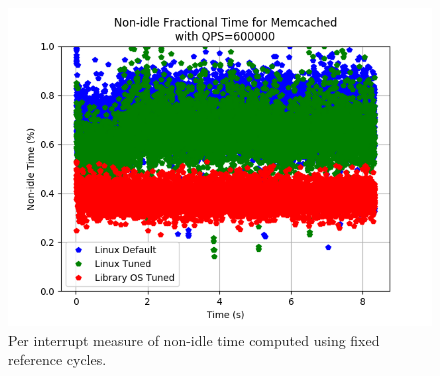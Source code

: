 \documentclass[pageno]{jpaper}
\begin{document}
 
\begin{figure}
	\includegraphics[width=\columnwidth]{asplos2021_figures/mcd_nonidle_QPS600000.png}
	\caption{Per interrupt measure of non-idle time computed using fixed reference cycles.}
	\label{fig:mcdnonidle600K}
\end{figure}
\end{document}
